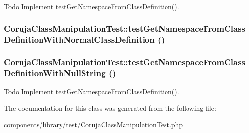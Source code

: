 \begin{Desc}
\item[\hyperlink{todo__todo000009}{Todo}]Implement testGetNamespaceFromClassDefinition(). \end{Desc}
\hypertarget{class_coruja_class_manipulation_test_4bc6c516b02ff2e92a533a1ed066ccbf}{
\subsubsection[{testGetNamespaceFromClassDefinitionWithNormalClassDefinition}]{\setlength{\rightskip}{0pt plus 5cm}CorujaClassManipulationTest::testGetNamespaceFromClassDefinitionWithNormalClassDefinition ()}}
\label{class_coruja_class_manipulation_test_4bc6c516b02ff2e92a533a1ed066ccbf}


\hypertarget{class_coruja_class_manipulation_test_ce9cf206ad48a158cd897305919b68cf}{
\subsubsection[{testGetNamespaceFromClassDefinitionWithNullString}]{\setlength{\rightskip}{0pt plus 5cm}CorujaClassManipulationTest::testGetNamespaceFromClassDefinitionWithNullString ()}}
\label{class_coruja_class_manipulation_test_ce9cf206ad48a158cd897305919b68cf}


\begin{Desc}
\item[\hyperlink{todo__todo000008}{Todo}]Implement testGetNamespaceFromClassDefinition(). \end{Desc}


The documentation for this class was generated from the following file:\begin{CompactItemize}
\item 
components/library/test/\hyperlink{_coruja_class_manipulation_test_8php}{CorujaClassManipulationTest.php}\end{CompactItemize}
